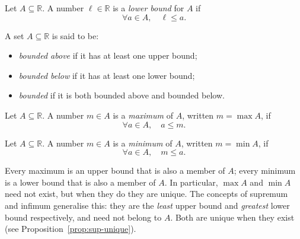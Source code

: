 \begin{tcolorbox}[colback=propbox, colframe=propborder, arc=2pt,
  left=6pt, right=6pt, top=4pt, bottom=4pt,
  title={\small\textbf{Definition (Lower Bound)}},
  fonttitle=\small\bfseries]
Let $A \subseteq \mathbb{R}$.
A number $\ell \in \mathbb{R}$ is a \emph{lower bound} for $A$ if
\[
\forall a \in A,\quad \ell \le a.
\]
\end{tcolorbox}

\begin{tcolorbox}[colback=propbox, colframe=propborder, arc=2pt,
  left=6pt, right=6pt, top=4pt, bottom=4pt,
  title={\small\textbf{Definition (Bounded Above / Below)}},
  fonttitle=\small\bfseries]
A set $A \subseteq \mathbb{R}$ is said to be:
\begin{itemize}
  \item \emph{bounded above} if it has at least one upper bound;
  \item \emph{bounded below} if it has at least one lower bound;
  \item \emph{bounded} if it is both bounded above and bounded below.
\end{itemize}
\end{tcolorbox}

\begin{tcolorbox}[colback=propbox, colframe=propborder, arc=2pt,
  left=6pt, right=6pt, top=4pt, bottom=4pt,
  title={\small\textbf{Definition (Maximum)}},
  fonttitle=\small\bfseries]
Let $A \subseteq \mathbb{R}$.
A number $m \in A$ is a \emph{maximum} of $A$, written $m = \max A$, if
\[
\forall a \in A,\quad a \le m.
\]
\end{tcolorbox}

\begin{tcolorbox}[colback=propbox, colframe=propborder, arc=2pt,
  left=6pt, right=6pt, top=4pt, bottom=4pt,
  title={\small\textbf{Definition (Minimum)}},
  fonttitle=\small\bfseries]
Let $A \subseteq \mathbb{R}$.
A number $m \in A$ is a \emph{minimum} of $A$, written $m = \min A$, if
\[
\forall a \in A,\quad m \le a.
\]
\end{tcolorbox}

\begin{remark*}
Every maximum is an upper bound that is also a member of $A$; every
minimum is a lower bound that is also a member of $A$.
In particular, $\max A$ and $\min A$ need not exist, but when they do
they are unique.
The concepts of supremum and infimum generalise this: they are the
\emph{least} upper bound and \emph{greatest} lower bound respectively,
and need not belong to $A$. Both are unique when they exist
(see Proposition~\ref{prop:sup-unique}).
\end{remark*}

